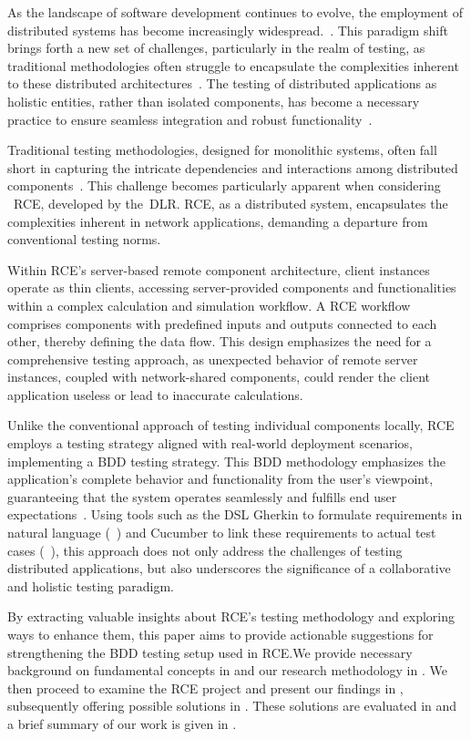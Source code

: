 As the landscape of software development continues to evolve, the employment of distributed systems has become increasingly widespread.~\cite{Xingang2018,Feldman1978}. This paradigm shift brings forth a new set of challenges, particularly in the realm of testing, as traditional methodologies often struggle to encapsulate the complexities inherent to these distributed architectures~\cite{Liu,Lima2017}. The testing of distributed applications as holistic entities, rather than isolated components, has become a necessary practice to ensure seamless integration and robust functionality~\cite{Liu,Lima2017}.

Traditional testing methodologies, designed for monolithic systems, often fall short in capturing the intricate dependencies and interactions among distributed components~\cite{Liu,Lima2017}. This challenge becomes particularly apparent when considering ~\acf{RCE}, developed by the~\acf{DLR}. \ac{RCE}, as a distributed system, encapsulates the complexities inherent in network applications, demanding a departure from conventional testing norms.

Within \ac{RCE}'s server-based remote component architecture, client instances operate as thin clients, accessing server-provided components and functionalities within a complex calculation and simulation workflow. A \ac{RCE} workflow comprises components with predefined inputs and outputs connected to each other, thereby defining the data flow. This design emphasizes the need for a comprehensive testing approach, as unexpected behavior of remote server instances, coupled with network-shared components, could render the client application useless or lead to inaccurate calculations.

Unlike the conventional approach of testing individual components locally, \ac{RCE} employs a testing strategy aligned with real-world deployment scenarios, implementing a \ac{BDD} testing strategy. This \ac{BDD} methodology emphasizes the application's complete behavior and functionality from the user's viewpoint, guaranteeing that the system operates seamlessly and fulfills end user expectations~\cite{wynne2012cucumber}. Using tools such as the \ac{DSL} Gherkin to formulate requirements in natural language (~) and Cucumber to link these requirements to actual test cases (~), this approach does not only address the challenges of testing distributed applications, but also underscores the significance of a collaborative and holistic testing paradigm.

By extracting valuable insights about \ac{RCE}'s testing methodology and exploring ways to enhance them, this paper aims to provide actionable suggestions for strengthening the \ac{BDD} testing setup used in \ac{RCE}.We provide necessary background on fundamental concepts in  and our research methodology in . We then proceed to examine the \ac{RCE} project and present our findings in , subsequently offering possible solutions in . These solutions are evaluated in and a brief summary of our work is given in .